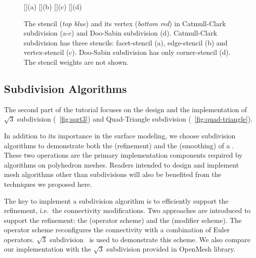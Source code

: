 \documentclass[twocolumn]{article}
\begin{document}
\begin{figure}[h]
  \centering
  []{(a)}
  []{(b)}
  []{(c)}
  []{(d)}
  \caption{The stencil ({\itshape top blue}) and its 
           vertex ({\itshape bottom red}) in 
           Catmull-Clark subdivision (a-c)
           and Doo-Sabin subdivision (d). Catmull-Clark
           subdivision has three stencils: facet-stencil (a), 
           edge-stencil (b) and vertex-stencil (c). 
           Doo-Sabin subdivision has only corner-stencil (d).
           The stencil weights are not shown.}
  \label{fig:RefMap}
\end{figure}


\subsection*{Subdivision Algorithms}

The second part of the tutorial focuses on the design and the
implementation of $\sqrt{3}$ subdivision (\figurename\ \ref{fig:sqrt3}) 
and Quad-Triangle subdivision (\figurename\ \ref{fig:quad-triangle}).  

In addition to its importance in the surface modeling, we 
choose subdivision algorithms to demonstrate both the 
 (refinement) and the
 (smoothing) of a
\cgalpoly . These two operations are the
primary implementation components required by algorithms on
polyhedron meshes. Readers intended to design and implement
mesh algorithms other than subdivisions will also be benefited
from the techniques we proposed here.

The key to implement a subdivision algorithm is to 
efficiently support the refinement, i.e.\ the connectivity 
modifications. Two approaches are introduced to support the 
refinement: the  (operator scheme) and
the  (modifier scheme). 
The operator scheme reconfigures the connectivity with a 
combination of Euler operators. $\sqrt{3}$ subdivision~\cite{sqrt3} is
used to demonstrate this scheme. We also compare our implementation
with the $\sqrt{3}$ subdivision provided in OpenMesh library.
\end{document}
